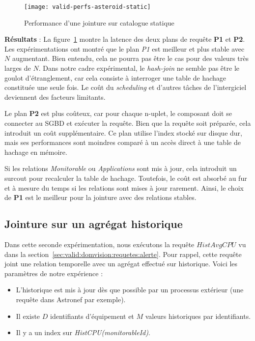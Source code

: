 \begin{figure}[ht]
	\centering
	\texttt{[image: valid-perfs-asteroid-static]}
	\caption{Performance d'une jointure sur catalogue statique}\label{fig:valid:perfs:asteroid:static}
\end{figure}

\textbf{Résultats} : La figure~\ref{fig:valid:perfs:asteroid:static} montre la latence des deux plans de requête \textbf{P1} et \textbf{P2}. Les expérimentations ont montré que le plan \textit{P1} est meilleur et plus stable avec $N$ augmentant. Bien entendu, cela ne pourra pas être le cas pour des valeurs très larges de $N$. Dans notre cadre expérimental, le \textit{hash-join} ne semble pas être le goulot d'étranglement, car cela consiste à interroger une table de hachage constituée une seule fois. Le coût du \textit{scheduling} et d'autres tâches de l'intergiciel deviennent des facteurs limitants.

Le plan \textbf{P2} est plus coûteux, car pour chaque n-uplet, le composant doit se connecter au SGBD et exécuter la requête. Bien que la requête soit préparée, cela introduit un coût supplémentaire. Ce plan utilise l'index stocké sur disque dur, mais ses performances sont moindres comparé à un accès direct à une table de hachage en mémoire.

Si les relations \textit{Monitorable} ou \textit{Applications} sont mis à jour, cela introduit un surcout pour recalculer la table de hachage. Toutefois, le coût est absorbé au fur et à mesure du temps si les relations sont mises à jour rarement. Ainsi, le choix de \textbf{P1} est le meilleur pour la jointure avec des relations stables.

\subsection{Jointure sur un agrégat historique}
Dans cette seconde expérimentation, nous exécutons la requête $HistAvgCPU$ vu dans la section~\ref{sec:valid:domvision:requetes:alerte}. Pour rappel, cette requête joint une relation temporelle avec un agrégat effectué sur historique. Voici les paramètres de notre expérience :
\begin{itemize}
	\item L'historique est mis à jour dès que possible par un processus extérieur (une requête dans Astronef par exemple).
	\item Il existe $D$ identifiants d'équipement et $M$ valeurs historiques par identifiants.
	\item Il y a un index sur \textit{HistCPU(monitorableId)}.
\end{itemize}

